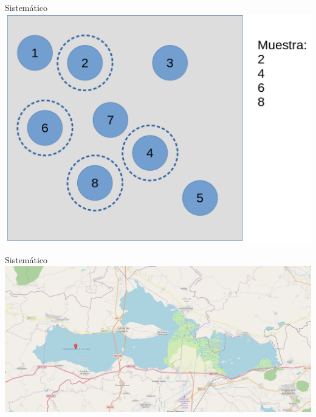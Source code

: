 \documentclass[
  11pt,
  ignorenonframetext,
]{beamer}
\begin{document}
\begin{frame}{Sistemático}
\protect\hypertarget{sistemuxe1tico}{}
\includegraphics{Figuras-tecnicas/Sistematico.png}
\end{frame}

\begin{frame}{Sistemático}
\protect\hypertarget{sistemuxe1tico-1}{}
\includegraphics{Figuras-tecnicas/Cuitzeo.png}
\end{frame}
\end{document}
